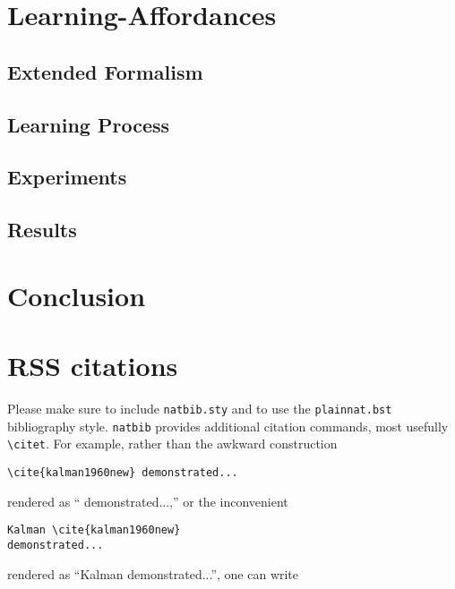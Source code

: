 \documentclass[conference]{IEEEtran}
\begin{document}
\section{Learning-Affordances}
\label{sec:learning-affordances}

\subsection{Extended Formalism}

\subsection{Learning Process}

\subsection{Experiments}

\subsection{Results}


\section{Conclusion}
\label{sec:conclusion}


\section{RSS citations}

Please make sure to include \verb!natbib.sty! and to use the
\verb!plainnat.bst! bibliography style. \verb!natbib! provides additional
citation commands, most usefully \verb!\citet!. For example, rather than the
awkward construction 

{\small
\begin{verbatim}
\cite{kalman1960new} demonstrated...
\end{verbatim}
}

\noindent
rendered as ``\cite{kalman1960new} demonstrated...,''
or the
inconvenient 

{\small
\begin{verbatim}
Kalman \cite{kalman1960new} 
demonstrated...
\end{verbatim}
}

\noindent
rendered as 
``Kalman \cite{kalman1960new} demonstrated...'', 
one can
write 
\end{document}
